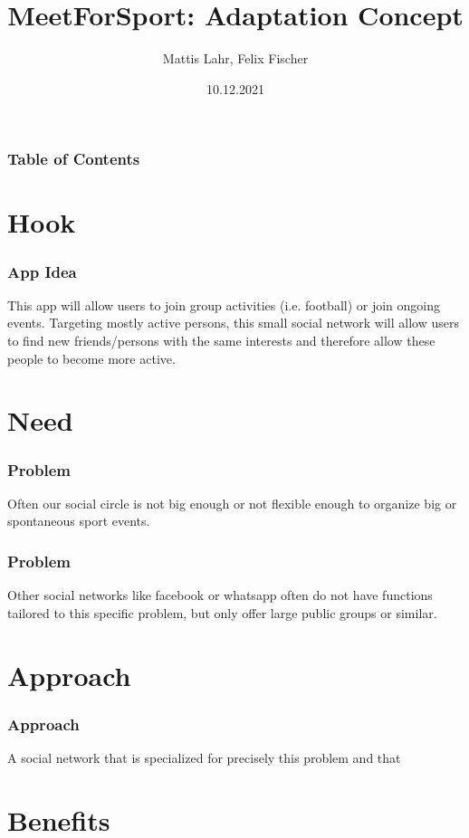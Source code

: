 \documentclass[aspectratio=169]{beamer}
\title{MeetForSport: Adaptation Concept}
\author{Mattis Lahr, Felix Fischer}
\date{10.12.2021}
\begin{document}
\maketitle



\begin{frame}
    \frametitle{Table of Contents}
    \tableofcontents
\end{frame}



\section{Hook}
\begin{frame}
\frametitle{App Idea}
This app will allow users to join group activities (i.e. football) or join ongoing events.
Targeting mostly active persons, this small social network will allow users  to find new friends/persons with the same interests and therefore allow these people to become more active.
\end{frame}

\section{Need}
	\begin{frame}
		\frametitle{Problem}
		Often our social circle is not big enough or not flexible enough to organize big or spontaneous sport events.
	\end{frame}

	\begin{frame}
		\frametitle{Problem}
		Other social networks like facebook or whatsapp often do not have functions tailored to this specific problem, but only offer large public groups or similar. 
	\end{frame}

\section{Approach}

	\begin{frame}
		\frametitle{Approach}
		A social network that is specialized for precisely this problem and that 
	\end{frame}


\section{Benefits}
\end{document}
